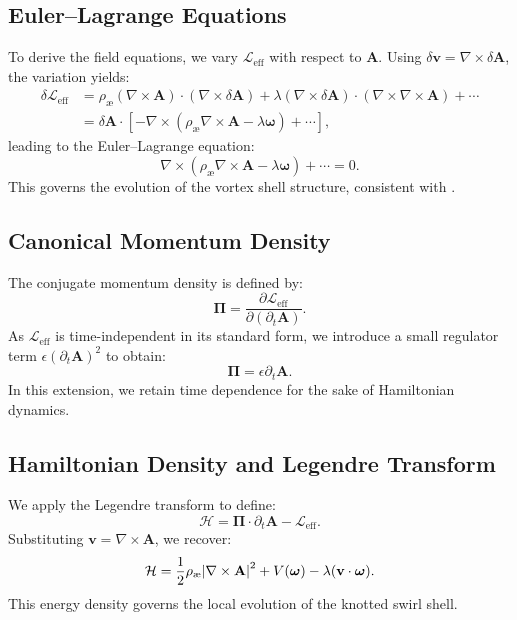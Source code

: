 \documentclass[preprint,notitlepage]{revtex4-2}
\begin{document}
    \subsection*{Euler–Lagrange Equations}
    To derive the field equations, we vary $\mathcal{L}_{\text{eff}}$ with respect to $\mathbf{A}$. Using $\delta \mathbf{v} = \nabla \times \delta \mathbf{A}$, the variation yields:
    \begin{align}
    \delta \mathcal{L}_{\text{eff}} &= \rho_{\text{\ae}} (\nabla \times \mathbf{A}) \cdot (\nabla \times \delta \mathbf{A}) + \lambda (\nabla \times \delta \mathbf{A}) \cdot (\nabla \times \nabla \times \mathbf{A}) + \cdots \\
    &= \delta \mathbf{A} \cdot \left[ - \nabla \times ( \rho_{\text{\ae}} \nabla \times \mathbf{A} - \lambda \boldsymbol{\omega} ) + \cdots \right],
    \end{align}
    leading to the Euler–Lagrange equation:
    \begin{equation}
    \nabla \times ( \rho_{\text{\ae}} \nabla \times \mathbf{A} - \lambda \boldsymbol{\omega} ) + \cdots = 0.
    \end{equation}
    This governs the evolution of the vortex shell structure, consistent with \cite{VAM-4}.
    
    \subsection*{Canonical Momentum Density}
    The conjugate momentum density is defined by:
    \begin{equation}
    \boldsymbol{\Pi} = \frac{\partial \mathcal{L}_{\text{eff}}}{\partial (\partial_t \mathbf{A})}.
    \end{equation}
    As $\mathcal{L}_{\text{eff}}$ is time-independent in its standard form, we introduce a small regulator term $\epsilon (\partial_t \mathbf{A})^2$ to obtain:
    \begin{equation}
    \boldsymbol{\Pi} = \epsilon \partial_t \mathbf{A}.
    \end{equation}
    In this extension, we retain time dependence for the sake of Hamiltonian dynamics.
    
    \subsection*{Hamiltonian Density and Legendre Transform}
    We apply the Legendre transform to define:
    \begin{equation}
    \mathcal{H} = \boldsymbol{\Pi} \cdot \partial_t \mathbf{A} - \mathcal{L}_{\text{eff}}.
    \end{equation}
    Substituting $\mathbf{v} = \nabla \times \mathbf{A}$, we recover:
    \begin{equation}
    \mathcal{H} = \frac{1}{2} \rho_{\text{\ae}} \abs{\nabla \times \mathbf{A}}^2 + V(\boldsymbol{\omega}) - \lambda (\mathbf{v} \cdot \boldsymbol{\omega}).
    \end{equation}
    This energy density governs the local evolution of the knotted swirl shell.
    
\end{document}
